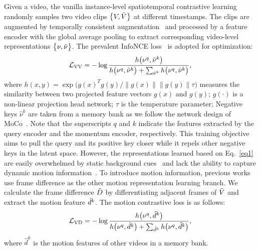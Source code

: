 \documentclass[sigconf,screen]{acmart}
\begin{document}
Given a video, the vanilla instance-level spatiotemporal contrastive learning randomly samples two video clips $\big\{V, \Tilde{V}\big\}$ at different timestamps. The clips are augmented by temporally consistent augmentation~\cite{CVRL} and processed by a feature encoder with the global average pooling to extract corresponding video-level representations $\big\{\nu, \Tilde{\nu}\big\}$. The prevalent InfoNCE loss~\cite{CPC} is adopted for optimization:
\begin{equation} \label{eq1}
\mathcal{L}_{\mathrm{VV}}=-\log \frac{h\big(\nu^q, \Tilde{\nu}^k\big)}{h\big(\nu^q, \Tilde{\nu}^k\big)+\sum_{\hat{\nu}^k} h\big(\nu^q, \hat{\nu}^k\big)},
\end{equation}
where $h(x, y)=\exp \big(g(x)^T g(y) /\|g(x)\|\|g(y)\| \tau\big)$ measures the similarity between two projected feature vectors $g(x)$ and $g(y)$; $g(\cdot)$ is a non-linear projection head network; $\tau$ is the temperature parameter; Negative keys $\hat{\nu}^k$ are taken from a memory bank as we follow the network design of MoCo~\cite{MoCov1}. Note that the superscripts $q$ and $k$ indicate the features extracted by the query encoder and the momentum encoder, respectively. This training objective aims to pull the query and its positive key closer while it repels other negative keys in the latent space. However, the representations learned based on Eq.~\eqref{eq1} are easily overwhelmed by static background cues~\cite{FAME,BE} and lack the ability to capture dynamic motion information~\cite{TCLR}. To introduce motion information, previous works~\cite{Dual,improvedIIC} use frame difference as the other motion representation learning branch. We calculate the frame difference $\Tilde{D}$ by differentiating adjacent frames of $\Tilde{V}$ and extract the motion feature $\Tilde{d}^k$. The motion contrastive loss is as follows: 
\begin{equation}
\mathcal{L}_{\mathrm{VD}}=-\log \frac{h\big(\nu^q, \Tilde{d}^k\big)}{h\big(\nu^q, \Tilde{d}^k\big)+\sum_{\hat{d}^k} h\big(\nu^q, \hat{d}^k\big)},
\end{equation}
where $\hat{d}^k$ is the motion features of other videos in a memory bank. 
\end{document}
